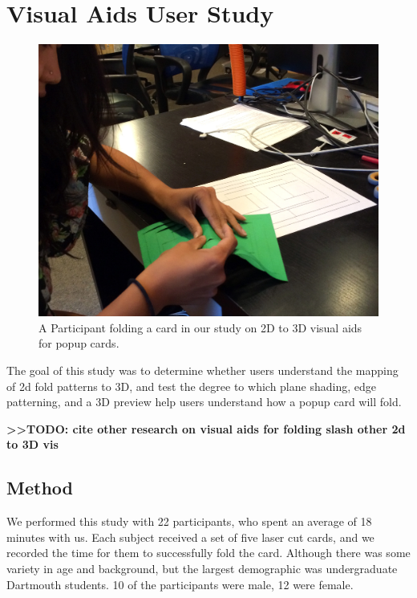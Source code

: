 \section{Visual Aids User Study}\label{visual-aids-user-study}

\begin{figure}[htbp]
\centering
\includegraphics{figures/51_User_Study_Visual_Aids/kikofoldling.jpg}
\caption{A Participant folding a card in our study on 2D to 3D visual
aids for popup cards.}
\end{figure}

The goal of this study was to determine whether users understand the
mapping of 2d fold patterns to 3D, and test the degree to which plane
shading, edge patterning, and a 3D preview help users understand how a
popup card will fold.

\textbf{\textgreater{}\textgreater{}TODO: cite other research on visual
aids for folding slash other 2d to 3D vis}

\subsection{Method}\label{method}

We performed this study with 22 participants, who spent an average of 18
minutes with us. Each subject received a set of five laser cut cards,
and we recorded the time for them to successfully fold the card.
Although there was some variety in age and background, but the largest
demographic was undergraduate Dartmouth students. 10 of the participants
were male, 12 were female.

